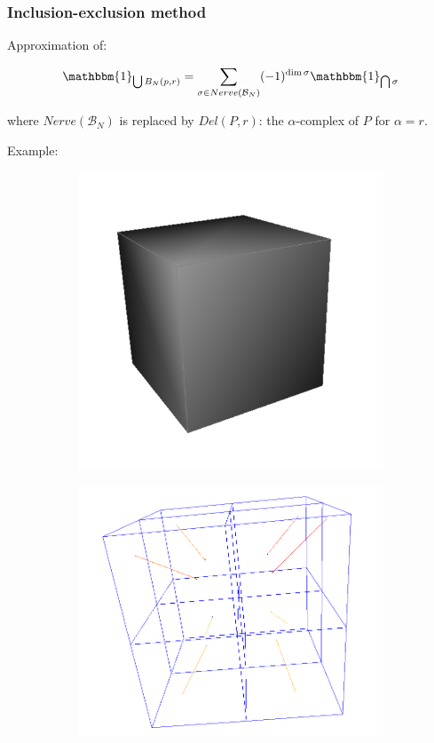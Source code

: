 \documentclass{beamer}
\newcommand{\indicator}[1]{\mathbbm{1}_{#1}}
\begin{document}
\begin{frame}
    \frametitle{Inclusion-exclusion method}

    Approximation of:

$$ \indicator{\bigcup B_N(p, r)} = \sum_{\sigma \in Nerve(\mathcal{B}_N)}
(-1)^{\dim \sigma} \indicator{\bigcap \sigma} $$

    where $ Nerve(\mathcal{B}_N) $ is replaced by $ Del(P, r) $: the
    $\alpha$-complex of $ P $ for $ \alpha = r $.


    Example:
    \begin{figure}
        \centering
        \begin{subfigure}{.3\textwidth}
            \centering
            \includegraphics[scale=0.2]{img/cube}
        \end{subfigure}
        \begin{subfigure}{.3\textwidth}
            \centering
            \includegraphics[scale=0.15]{img/cube-cube-15-naive}

\end{subfigure}
\end{figure}
\end{frame}
\end{document}
